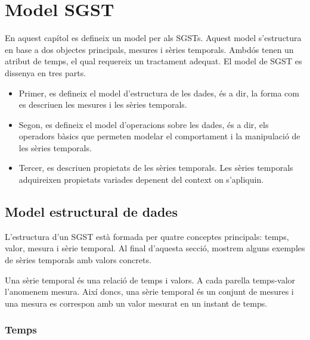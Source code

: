 \chapter{Model SGST}
\label{cap:model:sgst}

En aquest capítol es defineix un model per als \glspl{SGST}. Aquest model
s'estructura en base a dos objectes principals, mesures i sèries temporals.
Ambdós tenen un atribut de temps, el qual requereix un tractament
adequat. El model de \gls{SGST} es dissenya en tres parts.

\begin{itemize}

\item Primer, es defineix el model d'estructura de les dades, és a
  dir, la forma com es descriuen les mesures i les sèries temporals.  

\item Segon, es defineix el model d'operacions sobre les dades, és a
  dir, els operadors bàsics que permeten modelar el comportament i la
  manipulació de les sèries temporals.

\item Tercer, es descriuen propietats de les sèries
  temporals. Les sèries temporals adquireixen propietats
  variades depenent del context on s'apliquin.

\end{itemize}





\section{Model estructural de dades}

L'estructura d'un \gls{SGST} està formada per quatre conceptes
principals: temps, valor, mesura i sèrie temporal. Al final d'aquesta
secció, mostrem alguns exemples de sèries temporals amb valors
concrets.

Una sèrie temporal és una relació de temps i valors. A cada parella
temps-valor l'anomenem mesura. Així doncs, una sèrie temporal és un
conjunt de mesures i una mesura es correspon amb un valor mesurat en
un instant de temps.





\subsection{Temps}
\label{sec:sgst:temps}

